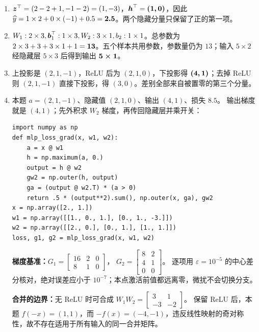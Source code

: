 \begin{enumerate}[label={},leftmargin=4.8em,itemsep=4pt]
\item[\textbf{\hyperref[exercise:mlp-activation-forward]{C-034.}}] \leavevmode{}\label{solution:C-034}\label{solution:mlp-activation-forward}$\boldsymbol{z}^\top=(2-2+1,-1-2)=(1,-3)$，$\boldsymbol{h}^\top=\boldsymbol{(1,0)}$，因此 $\widehat{y}=1\times2+0\times(-1)+0.5=\boldsymbol{2.5}$。两个隐藏分量只保留了正的第一项。
\item[\textbf{\hyperref[exercise:mlp-parameter-count]{C-035.}}] \leavevmode{}\label{solution:C-035}\label{solution:mlp-parameter-count}$W_1:2\times3,\boldsymbol{b}_1^\top:1\times3,W_2:3\times1,b_2:1\times1$。总参数为 $2\times3+3+3\times1+1=\boldsymbol{13}$。五个样本共用参数，参数量仍为 $13$；输入 $5\times2$ 经隐藏层 $5\times3$ 后得到输出 $\boldsymbol{5\times1}$。
\item[\textbf{\hyperref[exercise:mlp-negative-activation]{C-036.}}] \leavevmode{}\label{solution:C-036}\label{solution:mlp-negative-activation}上投影是 $(2,1,-1)$，ReLU 后为 $(2,1,0)$，下投影得 $\boldsymbol{(4,1)}$；去掉 ReLU 则 $(2,1,-1)$ 直接下投影，得 $(3,0)$。差别全部来自被置零的第三个分量。
\item[\textbf{\hyperref[exercise:mlp-linear-composition]{C-037.}}] \leavevmode{}\label{solution:C-037}\label{solution:mlp-linear-composition}本题 $a=(2,1,-1)$、隐藏值 $(2,1,0)$、输出 $(4,1)$、损失 $8.5$。
输出梯度就是 $(4,1)$；先外积求 $W_2$ 梯度，再传回隐藏层并乘开关：\par\nobreak
\begin{samepage}\begin{verbatim}
import numpy as np
def mlp_loss_grad(x, w1, w2):
    a = x @ w1
    h = np.maximum(a, 0.)
    output = h @ w2
    gw2 = np.outer(h, output)
    ga = (output @ w2.T) * (a > 0)
    return .5 * (output**2).sum(), np.outer(x, ga), gw2
x = np.array([2., 1.])
w1 = np.array([[1., 0., 1.], [0., 1., -3.]])
w2 = np.array([[2., 0.], [0., 1.], [1., 1.]])
loss, g1, g2 = mlp_loss_grad(x, w1, w2)
\end{verbatim}\end{samepage}
\textbf{梯度基准：}$G_1=\left[\begin{smallmatrix}16&2&0\\8&1&0\end{smallmatrix}\right]$，
$G_2=\left[\begin{smallmatrix}8&2\\4&1\\0&0\end{smallmatrix}\right]$。
逐项用 $\varepsilon=10^{-5}$ 的中心差分核对，绝对误差应小于 $10^{-7}$；本点激活前值都远离零，微扰不会切换分支。
\par\textbf{合并的边界：}无 ReLU 时可合成 $W_1W_2=\left[\begin{smallmatrix}3&1\\-3&-2\end{smallmatrix}\right]$。
保留 ReLU 后，本题 $f(-x)=(1,1)$，而 $-f(x)=(-4,-1)$，违反线性映射的奇对称性，故不存在适用于所有输入的同一合并矩阵。
\end{enumerate}
